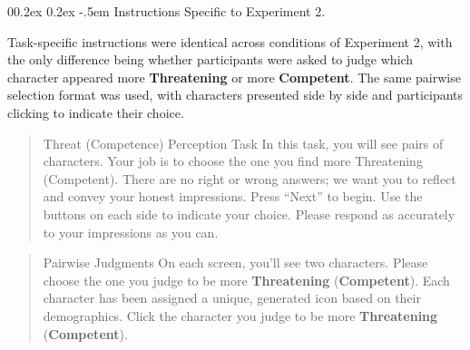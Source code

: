 \documentclass[
  man,
  floatsintext,
  longtable,
  nolmodern,
  notxfonts,
  notimes,
  draftfirst,
  colorlinks=true,linkcolor=blue,citecolor=blue,urlcolor=blue]{apa7}
\makeatletter
\renewcommand{\paragraph}{\@startsection{paragraph}{4}{\parindent}%
	{0\baselineskip \@plus 0.2ex \@minus 0.2ex}%
	{-.5em}%
	{\normalfont\normalsize\bfseries\typesectitle}}
\makeatother
\begin{document}
\paragraph{Instructions Specific to Experiment
2.}\label{instructions-specific-to-experiment-2}

Task-specific instructions were identical across conditions of
Experiment 2, with the only difference being whether participants were
asked to judge which character appeared more \textbf{Threatening} or
more \textbf{Competent}. The same pairwise selection format was used,
with characters presented side by side and participants clicking to
indicate their choice.

\begin{quote}
Threat (Competence) Perception Task In this task, you will see pairs of
characters. Your job is to choose the one you find more Threatening
(Competent). There are no right or wrong answers; we want you to reflect
and convey your honest impressions. Press ``Next'' to begin. Use the
buttons on each side to indicate your choice. Please respond as
accurately to your impressions as you can.
\end{quote}

\begin{quote}
Pairwise Judgments On each screen, you'll see two characters. Please
choose the one you judge to be more \textbf{Threatening}
(\textbf{Competent}). Each character has been assigned a unique,
generated icon based on their demographics. Click the character you
judge to be more \textbf{Threatening} (\textbf{Competent}).
\end{quote}
\end{document}
